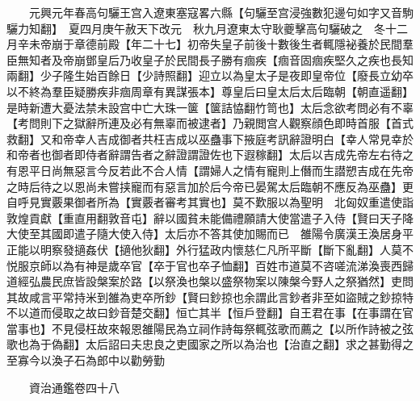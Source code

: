 　　元興元年春高句驪王宫入遼東塞寇畧六縣【句驪至宫浸強數犯邊句如字又音駒驪力知翻】　夏四月庚午赦天下改元　秋九月遼東太守耿夔擊高句驪破之　冬十二月辛未帝崩于章德前殿【年二十七】初帝失皇子前後十數後生者輒隱袐養於民間羣臣無知者及帝崩鄧皇后乃收皇子於民間長子勝有痼疾【痼音固痼疾堅久之疾也長知兩翻】少子隆生始百餘日【少詩照翻】迎立以為皇太子是夜即皇帝位【廢長立幼卒以不終為羣臣疑勝疾非痼周章有異謀張本】尊皇后曰皇太后太后臨朝【朝直遥翻】是時新遭大憂法禁未設宫中亡大珠一箧【箧詰恊翻竹笥也】太后念欲考問必有不辜【考問則下之獄辭所連及必有無辜而被逮者】乃親閲宫人觀察顔色即時首服【首式救翻】又和帝幸人吉成御者共枉吉成以巫蠱事下掖庭考訊辭證明白【幸人常見幸於和帝者也御者即侍者辭謂告者之辭證謂證佐也下遐稼翻】太后以吉成先帝左右待之有恩平日尚無惡言今反若此不合人情【謂婦人之情有寵則上僭而生譛愬吉成在先帝之時后待之以恩尚未嘗挟寵而有惡言加於后今帝已晏駕太后臨朝不應反為巫蠱】更自呼見實覈果御者所為【實覈者審考其實也】莫不歎服以為聖明　北匈奴重遣使詣敦煌貢獻【重直用翻敦音屯】辭以國貧未能備禮願請大使當遣子入侍【賢曰天子降大使至其國即遣子隨大使入侍】太后亦不答其使加賜而已　雒陽令廣漢王渙居身平正能以明察發擿姦伏【擿他狄翻】外行猛政内懷慈仁凡所平斷【斷下亂翻】人莫不悦服京師以為有神是歲卒官【卒于官也卒子恤翻】百姓市道莫不咨嗟流涕渙喪西歸道經弘農民庶皆設槃案於路【以祭渙也槃以盛祭物案以陳槃今野人之祭猶然】吏問其故咸言平常持米到雒為吏卒所鈔【賢曰鈔掠也余謂此言鈔者非至如盜賊之鈔掠特不以道而侵取之故曰鈔音楚交翻】恒亡其半【恒戶登翻】自王君在事【在事謂在官當事也】不見侵枉故來報恩雒陽民為立祠作詩每祭輒弦歌而薦之【以所作詩被之弦歌也為于偽翻】太后詔曰夫忠良之吏國家之所以為治也【治直之翻】求之甚勤得之至寡今以渙子石為郎中以勸勞勤

　　資治通鑑卷四十八  
    


 


 



 

 
  







 


　　
　　
　
　
　


　　

　















